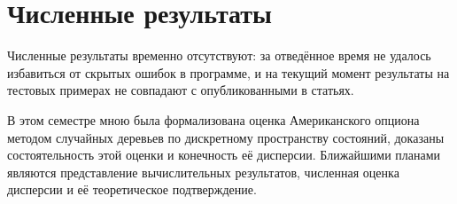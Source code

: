 \documentclass[specialist,
               substylefile = ../spbu.rtx,
               subf,href,colorlinks=true, 12pt]{disser}
\begin{document}
\chapter{Численные результаты}
    Численные результаты временно отсутствуют: за отведённое время не удалось избавиться от скрытых ошибок в программе, и на текущий момент результаты на тестовых примерах не совпадают с опубликованными в статьях.

\conclusion
    В этом семестре мною была формализована оценка Американского опциона методом случайных деревьев по дискретному пространству состояний, доказаны состоятельность этой оценки и конечность её дисперсии. Ближайшими планами являются представление вычислительных результатов, численная оценка дисперсии и её теоретическое подтверждение.
    



\end{document}
